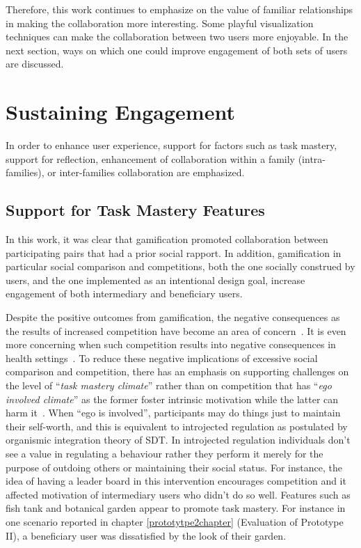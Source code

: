 Therefore, this work continues to emphasize on the value of familiar relationships in making the collaboration more interesting. Some playful visualization techniques can make the collaboration between two users more enjoyable. In the next section, ways on which one could improve engagement of both sets of users are discussed.

\section{Sustaining Engagement}
In order to enhance user experience, support for factors such as task mastery, support for reflection, enhancement of collaboration within a family (intra-families), or inter-families collaboration are emphasized.
\subsection{Support for Task Mastery Features}
In this work, it was clear that gamification promoted collaboration between participating pairs that had a prior social rapport. In addition, gamification in particular social comparison and competitions, both the one socially construed by users, and the one implemented as an intentional design goal,   increase engagement of both intermediary and beneficiary users.

Despite the positive outcomes from gamification, the negative consequences as the results of increased competition have become an area of concern~\citep{jia2016personality}. It is even more concerning when such competition results into negative consequences in health settings~\citep{grimes2009toward}. To reduce these negative implications of excessive social comparison and competition, there has an emphasis on supporting challenges on the level of ``\emph{task mastery climate}'' rather than on competition that has ``\emph{ego involved climate}'' as the  former foster intrinsic motivation while the latter can harm it~\citep{saksono2015spaceship}. When ``ego is involved'', participants may do things just to maintain their self-worth, and this is equivalent to introjected regulation as postulated by organismic integration theory of SDT\citep{ryan2000:self}. In introjected regulation individuals don't see a value in regulating a behaviour rather they perform it merely for the purpose of outdoing others or maintaining their social status. For instance, the idea of having a leader board in this intervention encourages competition and it affected motivation of intermediary users who didn't do so well. Features such as fish tank and botanical garden appear to promote task mastery. For instance in one scenario reported in chapter \ref{prototytpe2chapter} (Evaluation of Prototype II),  a beneficiary user was dissatisfied by the look of their garden.

